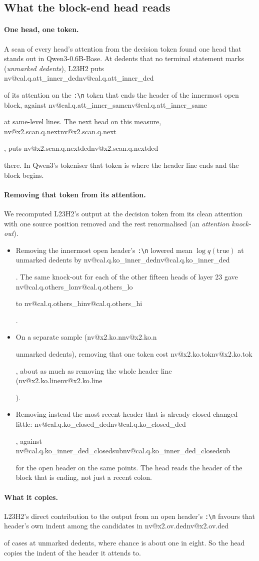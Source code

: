 \documentclass[11pt]{article}
\makeatletter
\newcommand{\nv}[1]{\ifcsname nv@#1\endcsname\csname nv@#1\endcsname\else\PackageError{numbers}{Unknown number key #1}{}\fi}
\newcommand{\qw}{Qwen3-0.6B-Base}
\newcommand{\hd}[2]{L#1H#2}
\newcommand{\code}[1]{\texttt{#1}}
\makeatother
\begin{document}
\subsection{What the block-end head reads}
\label{sec:reads}

\paragraph{One head, one token.} A scan of every head's attention from the decision token found one head that stands out in \qw{}. At dedents that no terminal statement marks (\emph{unmarked dedents}), \hd{23}{2} puts \nv{cal.q.att_inner_ded} of its attention on the \code{:\textbackslash n} token that ends the header of the innermost open block, against \nv{cal.q.att_inner_same} at same-level lines. The next head on this measure, \nv{x2.scan.q.next}, puts \nv{x2.scan.q.nextded} there. In Qwen3's tokeniser that token is where the header line ends and the block begins.

\paragraph{Removing that token from its attention.} We recomputed \hd{23}{2}'s output at the decision token from its clean attention with one source position removed and the rest renormalised (an \emph{attention knock-out}).
\begin{itemize}
\item Removing the innermost open header's \code{:\textbackslash n} lowered mean $\log q(\text{true})$ at unmarked dedents by \nv{cal.q.ko_inner_ded}. The same knock-out for each of the other fifteen heads of layer 23 gave \nv{cal.q.others_lo} to \nv{cal.q.others_hi}.
\item On a separate sample (\nv{x2.ko.n} unmarked dedents), removing that one token cost \nv{x2.ko.tok}, about as much as removing the whole header line (\nv{x2.ko.line}).
\item Removing instead the most recent header that is already closed changed little: \nv{cal.q.ko_closed_ded}, against \nv{cal.q.ko_inner_ded_closedsub} for the open header on the same points. The head reads the header of the block that is ending, not just a recent colon.
\end{itemize}

\paragraph{What it copies.} \hd{23}{2}'s direct contribution to the output from an open header's \code{:\textbackslash n} favours that header's own indent among the candidates in \nv{x2.ov.ded} of cases at unmarked dedents, where chance is about one in eight. So the head copies the indent of the header it attends to.
\end{document}
